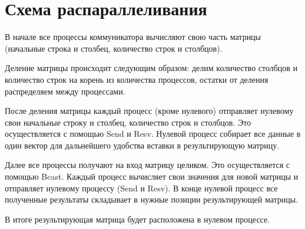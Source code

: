 \documentclass{report}
\begin{document}
\section*{Схема распараллеливания}
В начале все процессы коммуникатора вычисляют свою часть матрицы (начальные строка и столбец, количество строк и столбцов). 
\par
Деление матрицы происходит следующим образом: делим количество столбцов и количество строк на корень из количества процессов, остатки от деления распределяем между процессами.
\par
После деления матрицы каждый процесс (кроме нулевого) отправляет нулевому свои начальные строку и столбец, количество строк и столбцов. Это осуществляется с помощью Send и Resv. Нулевой процесс собирает все данные в один вектор для дальнейшего удобства вставки в результирующую матрицу.
\par
Далее все процессы получают на вход матрицу целиком. Это осуществляется с помощью Bcast. Каждый процесс вычисляет свои значения для новой матрицы и отправляет нулевому процессу (Send и Resv). В конце нулевой процесс все полученные результаты складывает в нужные позиции результирующей матрицы.
\par
В итоге результирующая матрица будет расположена в нулевом процессе.
\newpage

\end{document}
